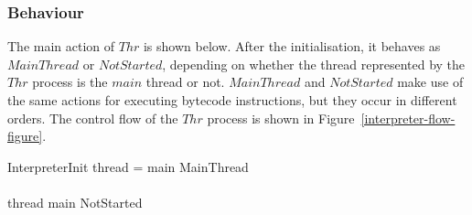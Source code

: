 \subsubsection*{Behaviour}

The main action of $Thr$ is shown below. 
After the initialisation, it behaves as $MainThread$ or $NotStarted$,
depending on whether the thread represented by the $Thr$ process is
the $main$ thread or not.
$MainThread$ and $NotStarted$ make use of the same actions for
executing bytecode instructions, but they occur in different orders.
The control flow of the $Thr$ process is shown in
Figure~\ref{interpreter-flow-figure}.
\begin{circusaction}
  \circspot \lschexpract InterpreterInit \rschexpract \circseq {}
  \circblockbegin
    \lcircguard thread = main \rcircguard \circguard MainThread \\
    {} \extchoice {} \\
    \lcircguard thread \neq main \rcircguard \circguard NotStarted
  \circblockend
\end{circusaction}

